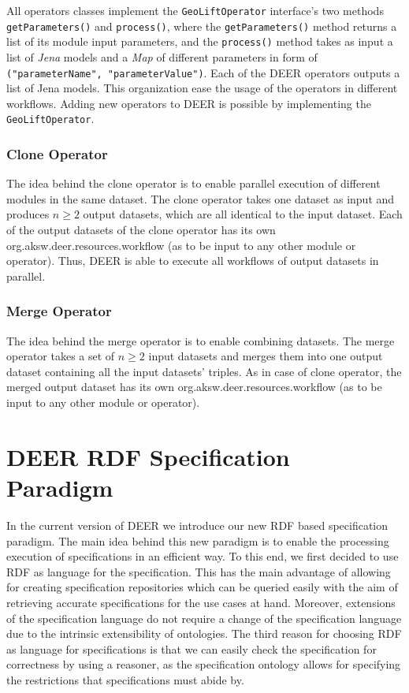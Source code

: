 \documentclass[a4paper,twoside,bibtotoc,abstracton,12pt,BCOR=15mm]{article}
\newcommand{\geolift}{\textsc{DEER}\xspace}
\begin{document}
  All operators classes implement the \texttt{GeoLiftOperator} interface's two methods \texttt{getParameters()} and \texttt{process()},
 where the \texttt{getParameters()} method returns a list of its module input parameters,
 and the \texttt{process()} method takes as input a list of \emph{Jena} models and a \emph{Map} of different parameters in form of \texttt{("parameterName", "parameterValue")}.
 Each of the \geolift operators outputs a list of Jena models.
 This organization ease the usage of the operators in different workflows.
 Adding new operators to \geolift is possible by implementing the \texttt{GeoLiftOperator}.

\subsubsection{Clone Operator}
The idea behind the clone operator is to enable parallel execution of different modules in the same dataset. 
The clone operator takes one dataset as input and produces $n \geq 2$ output datasets, which are all identical to the input dataset.
Each of the output datasets of the clone operator has its own org.aksw.deer.resources.workflow (as to be input to any other module or operator).
Thus, \geolift is able to execute all workflows of output datasets in parallel. 

\subsubsection{Merge Operator}
The idea behind the merge operator is to enable combining datasets.
The merge operator takes a set of $n \geq 2$ input datasets and merges them into one output dataset containing all the input datasets' triples.
As in case of clone operator, the merged output dataset has its own org.aksw.deer.resources.workflow (as to be input to any other module or operator).

\section{\geolift RDF Specification Paradigm}
In the current version of \geolift we introduce our new RDF based specification paradigm.
The main idea behind this new paradigm is to enable the processing execution of specifications in an efficient way.
To this end, we first decided to use RDF as language for the specification. This has the main advantage of allowing for creating specification repositories which can be queried easily with the aim of retrieving accurate specifications for the use cases at hand. Moreover, extensions of the specification language do not require a change of the specification language due to the intrinsic extensibility of ontologies. The third reason for choosing RDF as language for specifications is that we can easily check the specification for correctness by using a reasoner, as the specification ontology allows for specifying the restrictions that specifications must abide by.
\end{document}
